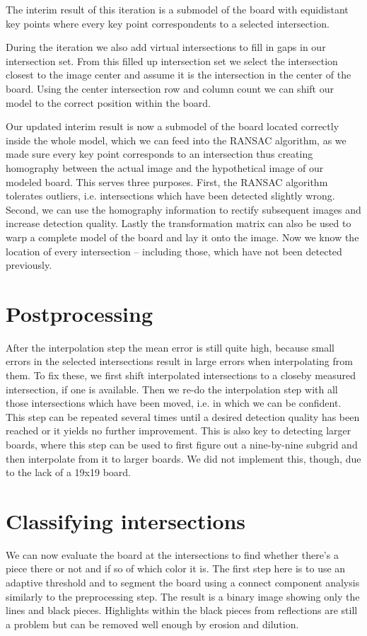 	The interim result of this iteration is a submodel of the board with equidistant key points where every key point correspondents to a selected intersection.

	During the iteration we also add virtual intersections to fill in gaps in our intersection set. From this filled up intersection set we select the intersection closest to the image center and assume it is the intersection in the center of the board. Using the center intersection row and column count we can shift our model to the correct position within the board.

	Our updated interim result is now a submodel of the board located correctly inside the whole model, which we can feed into the RANSAC algorithm, as we made sure every key point corresponds to an intersection thus creating homography between the actual image and the hypothetical image of our modeled board. This serves three purposes. First, the RANSAC algorithm tolerates outliers, i.e. intersections which have been detected slightly wrong. Second, we can use the homography information to rectify subsequent images and increase detection quality. Lastly the transformation matrix can also be used to warp a complete model of the board and lay it onto the image. Now we know the location of every intersection -- including those, which have not been detected previously.

	\section{Postprocessing}
	\label{detector-postprocessing}
	After the interpolation step the mean error is still quite high, because small errors in the selected intersections result in large errors when interpolating from them. To fix these, we first shift interpolated intersections to a closeby measured intersection, if one is available. Then we re-do the interpolation step with all those intersections which have been moved, i.e. in which we can be confident. This step can be repeated several times until a desired detection quality has been reached or it yields no further improvement. This is also key to detecting larger boards, where this step can be used to first figure out a nine-by-nine subgrid and then interpolate from it to larger boards. We did not implement this, though, due to the lack of a 19x19 board.

	\section{Classifying intersections}
	\label{detector-classifying}
	We can now evaluate the board at the intersections to find whether there's a piece there or not and if so of which color it is. The first step here is to use an adaptive threshold and to segment the board using a connect component analysis similarly to the preprocessing step. The result is a binary image showing only the lines and black pieces. Highlights within the black pieces from reflections are still a problem but can be removed well enough by erosion and dilution.

